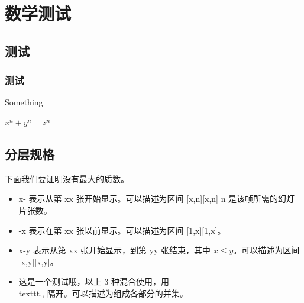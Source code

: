 \documentclass{beamer}
\begin{document}
{%

\section{数学测试}
    \subsection{测试}
    \begin{frame}\frametitle{测试}
        Something \pause %

        $x^n+y^n=z^n$
    \end{frame}

    \subsection{分层规格}
    \begin{frame} 

        下面我们要证明没有最大的质数。
    
        \begin{itemize}
            \item<1-> x- 表示从第 xx 张开始显示。可以描述为区间 [x,n][x,n] n 是该帧所需的幻灯片张数。
            \item<3-> -x 表示在第 xx 张以前显示。可以描述为区间 [1,x][1,x]。
            \item<1-> x-y 表示从第 xx 张开始显示，到第 yy 张结束，其中 $x\le y$。可以描述为区间 [x,y][x,y]。
            \item<2-> 这是一个测试哦，以上 3 种混合使用，用 \\texttt,, 隔开。可以描述为组成各部分的并集。
        \end{itemize}
    
    \end{frame}

}
\end{document}
